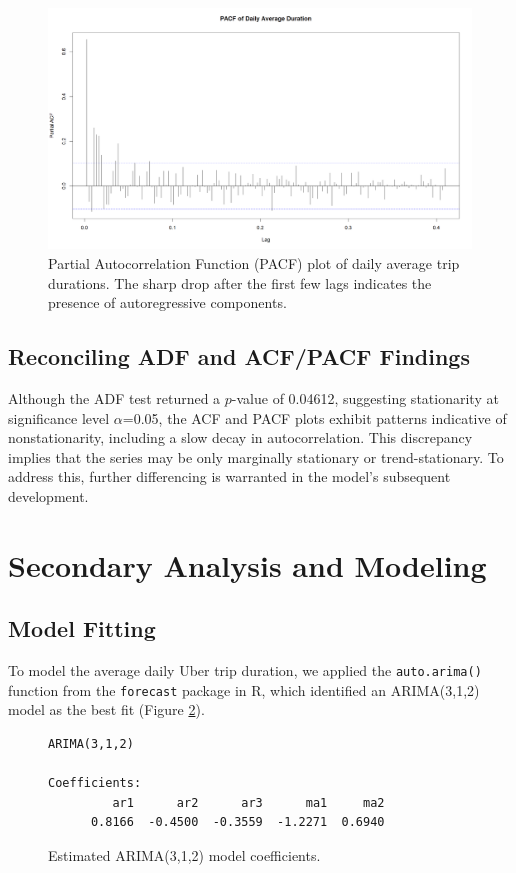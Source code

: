\documentclass{article}
\begin{document}
\begin{figure}
  \includegraphics[width=\textwidth]{finalproject/images/pacf-plot.png}
  \caption{Partial Autocorrelation Function (PACF) plot of daily average trip durations. The sharp drop after the first few lags indicates the presence of autoregressive components.}
  \label{fig:pacf_plot}
\end{figure}

\subsection{Reconciling ADF and ACF/PACF Findings}
Although the ADF test returned a $p$-value of 0.04612, suggesting stationarity at significance level $\alpha$=0.05, the ACF and PACF plots exhibit patterns indicative of nonstationarity, including a slow decay in autocorrelation. This discrepancy implies that the series may be only marginally stationary or trend-stationary. To address this, further differencing is warranted in the model's subsequent development.


\section{Secondary Analysis and Modeling}

\subsection{Model Fitting}

To model the average daily Uber trip duration, we applied the \texttt{auto.arima()} function from the \texttt{forecast} package in R, which identified an ARIMA(3,1,2) model as the best fit (Figure \ref{fig:arima_coefficients}).

\begin{figure}[ht]
\centering
\label{fig:arima_coefficients}
\begin{lstlisting}[basicstyle=\ttfamily]
ARIMA(3,1,2)

Coefficients:
         ar1      ar2      ar3      ma1     ma2
      0.8166  -0.4500  -0.3559  -1.2271  0.6940
\end{lstlisting}
\caption{Estimated ARIMA(3,1,2) model coefficients.}
\end{figure}
\end{document}
